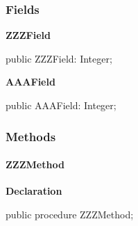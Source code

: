 \documentclass{report}
\newif\ifpdf
\begin{document}
\subsubsection*{\large{\textbf{Fields}}\normalsize\hspace{1ex}\hfill}
\begin{list}{}{
\setlength{\itemindent}{0cm}
\setlength{\listparindent}{0cm}
\setlength{\leftmargin}{\evensidemargin}
\addtolength{\leftmargin}{\tmplength}
\settowidth{\labelsep}{X}
\addtolength{\leftmargin}{\labelsep}
\setlength{\labelwidth}{\tmplength}
}
\label{ok_sorting.TMyClass-ZZZField}
\item[\textbf{ZZZField}\hfill]
\ifpdf
\begin{flushleft}
\fi
\begin{ttfamily}
public ZZZField: Integer;\end{ttfamily}

\ifpdf
\end{flushleft}
\fi


\par  \label{ok_sorting.TMyClass-AAAField}
\item[\textbf{AAAField}\hfill]
\ifpdf
\begin{flushleft}
\fi
\begin{ttfamily}
public AAAField: Integer;\end{ttfamily}

\ifpdf
\end{flushleft}
\fi


\par  \end{list}
\subsubsection*{\large{\textbf{Methods}}\normalsize\hspace{1ex}\hfill}
\paragraph*{ZZZMethod}\hspace*{\fill}

\label{ok_sorting.TMyClass-ZZZMethod}
\begin{list}{}{
\setlength{\itemindent}{0cm}
\setlength{\listparindent}{0cm}
\setlength{\leftmargin}{\evensidemargin}
\addtolength{\leftmargin}{\tmplength}
\settowidth{\labelsep}{X}
\addtolength{\leftmargin}{\labelsep}
\setlength{\labelwidth}{\tmplength}
}
\item[\textbf{Declaration}\hfill]
\ifpdf
\begin{flushleft}
\fi
\begin{ttfamily}
public procedure ZZZMethod;\end{ttfamily}

\ifpdf
\end{flushleft}
\fi

\end{list}
\end{document}
